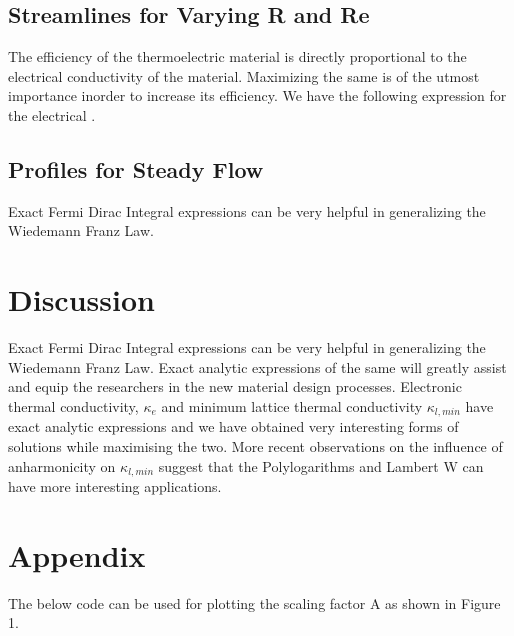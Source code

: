 \documentclass{article}
\begin{document}
\subsection{Streamlines for Varying R and Re}
The efficiency of the thermoelectric material is directly proportional to the electrical conductivity of the material. Maximizing the same is of the utmost importance inorder to increase its efficiency. We have the following expression for the electrical . \citep{articleSRV}


\subsection{Profiles for Steady Flow}

Exact Fermi Dirac Integral expressions can be very helpful in generalizing the Wiedemann Franz  Law. 

\section{Discussion}

Exact Fermi Dirac Integral expressions can be very helpful in generalizing the Wiedemann Franz  Law. Exact analytic expressions of the same will greatly assist and equip the researchers in the new material design processes.  Electronic thermal conductivity, $\kappa_e$ and minimum lattice thermal conductivity $\kappa_{l,min}$  have exact analytic expressions and we have obtained very interesting forms of solutions while maximising the two. More recent observations on the influence of anharmonicity on  $\kappa_{l,min}$  suggest that the Polylogarithms and Lambert W can have more interesting applications.

\section*{Appendix}
The below code can be used for plotting the scaling factor A as shown in Figure 1.




\end{document}
